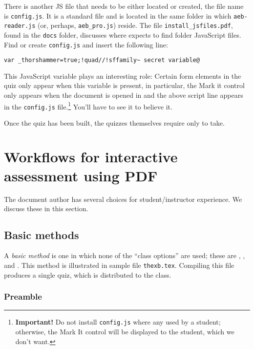 \documentclass{article}
\def\FmtMP#1{\marginpar{\small\itshape\raggedleft#1}}
\edef\amtIndent{\the\parindent}
\begin{document}
There is another JS file that needs to be either located or created, the file
name is \texttt{config.js}\FmtMP{edit \textsf{config.js}}. It is a standard
 file and is located in the same folder in which
\texttt{aeb-reader.js} (or, perhaps, \texttt{aeb\_pro.js}) reside. The file
\texttt{install\_jsfiles.pdf}, found in the \texttt{docs} folder, discusses
where  expects to find folder JavaScript files. Find or create
\texttt{config.js} and insert the following line:
\begin{Verbatim}[xleftmargin=\amtIndent,commandchars=!~@]
var _thorshammer=true;!quad//!sffamily~ secret variable@
\end{Verbatim}
This JavaScript variable plays an interesting role: Certain form elements in
the quiz only appear when this variable is present, in particular, the
\textsf{Mark it} control only appears when the document is opened in
 and the above script line appears in the \texttt{config.js}
file.\footnote{\textbf{Important!} Do not install \texttt{config.js} where
any  used by a student; otherwise, the \textsf{Mark It} control will
be displayed to the student, which we don't want.} You'll have to see it to
believe it.

\newtopic\noindent
Once the quiz has been built, the quizzes themselves require only  to take.

\newpage

\section{Workflows for interactive assessment using PDF}

The document author has several choices for student/instructor experience. We
discuss these in this section.

\subsection{Basic methods}\label{ss:BMs}

A \emph{basic method}\FmtMP{basic method} is one in which none of the ``class options'' are used; these
are , , and .
This method is illustrated in sample file \texttt{thexb.tex}. Compiling this file
produces a single quiz, which is distributed to the class.

\subsubsection{Preamble}
\end{document}
